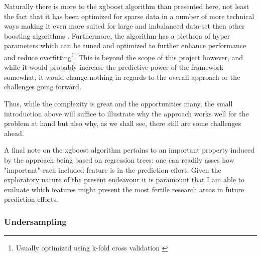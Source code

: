 \documentclass[a4paper]{article}
\begin{document}
Naturally there is more to the xgboost algorithm than presented here, not least the fact that it has been optimized for sparse data in a number of more technical ways making it even more suited for large and imbalanced data-set then other boosting algorithms \cite[5]{Chen_2016}. Furthermore, the algorithm has a plethora of hyper parameters which can be tuned and optimized to further enhance performance and reduce overfitting\footnote{Usually optimized using k-fold cross validation \citep[241-249]{Friedman_2001}}. This is beyond the scope of this project however, and while it would probably increase the predictive power of the framework somewhat, it would change nothing in regards to the overall approach or the challenges going forward.\par 

Thus, while the complexity is great and the opportunities many, the small introduction above will suffice to illustrate why the approach works well for the problem at hand but also why, as we shall see, there still are some challenges ahead.\par

A final note on the xgboost algorithm pertains to an important property induced by the approach being based on regression trees: one can readily asses how "important" each included feature is in the prediction effort. Given the exploratory nature of the present endeavour it is paramount that I am able to evaluate which features might present the most fertile research areas in future prediction efforts.\par

\subsubsection{Undersampling}
\end{document}
